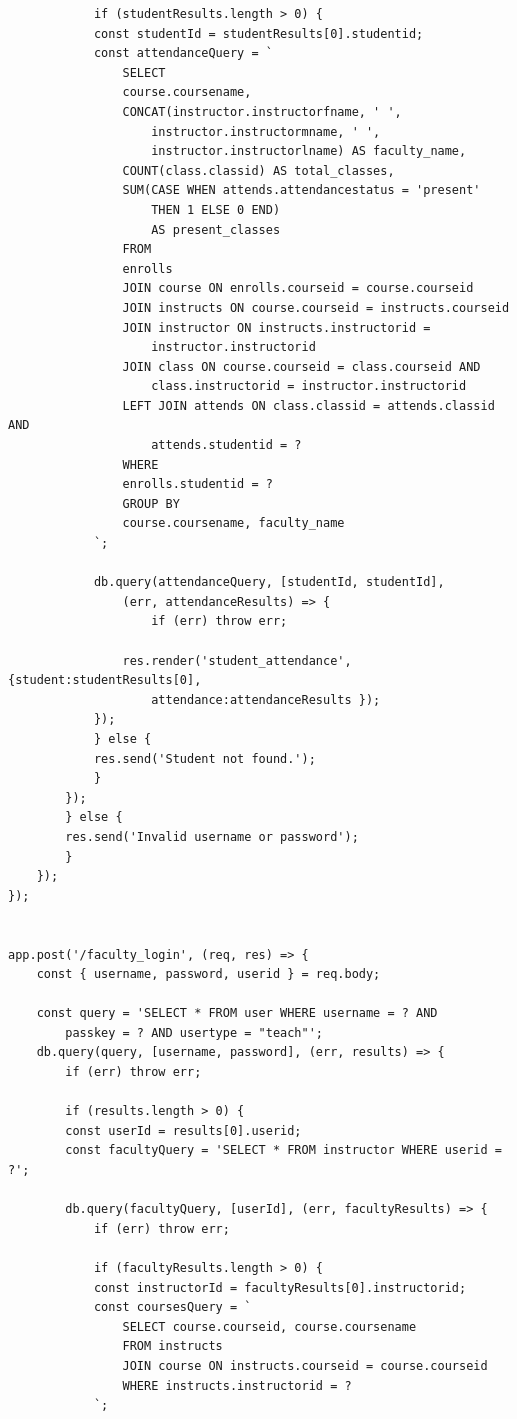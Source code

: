 \documentclass{article}
\begin{document}
\begin{large}
\begin{verbatim}
            if (studentResults.length > 0) {
            const studentId = studentResults[0].studentid;
            const attendanceQuery = `
                SELECT 
                course.coursename, 
                CONCAT(instructor.instructorfname, ' ', 
                    instructor.instructormname, ' ',
                    instructor.instructorlname) AS faculty_name,
                COUNT(class.classid) AS total_classes,
                SUM(CASE WHEN attends.attendancestatus = 'present' 
                    THEN 1 ELSE 0 END) 
                    AS present_classes
                FROM 
                enrolls
                JOIN course ON enrolls.courseid = course.courseid
                JOIN instructs ON course.courseid = instructs.courseid
                JOIN instructor ON instructs.instructorid = 
                    instructor.instructorid
                JOIN class ON course.courseid = class.courseid AND 
                    class.instructorid = instructor.instructorid
                LEFT JOIN attends ON class.classid = attends.classid AND 
                    attends.studentid = ?
                WHERE 
                enrolls.studentid = ?
                GROUP BY 
                course.coursename, faculty_name
            `;

            db.query(attendanceQuery, [studentId, studentId], 
                (err, attendanceResults) => {
                    if (err) throw err;

                res.render('student_attendance', {student:studentResults[0], 
                    attendance:attendanceResults });
            });
            } else {
            res.send('Student not found.');
            }
        });
        } else {
        res.send('Invalid username or password');
        }
    });
});


app.post('/faculty_login', (req, res) => {
    const { username, password, userid } = req.body;

    const query = 'SELECT * FROM user WHERE username = ? AND 
        passkey = ? AND usertype = "teach"';
    db.query(query, [username, password], (err, results) => {
        if (err) throw err;

        if (results.length > 0) {
        const userId = results[0].userid;
        const facultyQuery = 'SELECT * FROM instructor WHERE userid = ?';
        
        db.query(facultyQuery, [userId], (err, facultyResults) => {
            if (err) throw err;

            if (facultyResults.length > 0) {
            const instructorId = facultyResults[0].instructorid;
            const coursesQuery = `
                SELECT course.courseid, course.coursename 
                FROM instructs 
                JOIN course ON instructs.courseid = course.courseid 
                WHERE instructs.instructorid = ?
            `;


\end{verbatim}
\end{large}
\end{document}
